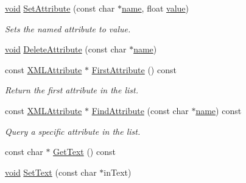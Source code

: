 \begin{DoxyCompactItemize}
\mbox{\label{classtinyxml2_1_1_x_m_l_element_a554b70d882e65b28fc084b23df9b9759}} 
\hyperlink{interfacevoid}{void} \hyperlink{classtinyxml2_1_1_x_m_l_element_a554b70d882e65b28fc084b23df9b9759}{Set\+Attribute} (const char $\ast$\hyperlink{structname}{name}, float \hyperlink{unionvalue}{value})
\begin{DoxyCompactList}\small\item\em Sets the named attribute to value. \end{DoxyCompactList}\item 
\hyperlink{interfacevoid}{void} \hyperlink{classtinyxml2_1_1_x_m_l_element_aebd45aa7118964c30b32fe12e944628a}{Delete\+Attribute} (const char $\ast$\hyperlink{structname}{name})
\item 
\mbox{\label{classtinyxml2_1_1_x_m_l_element_a3e191704c8d499906ec11fe2f60c6686}} 
const \hyperlink{classtinyxml2_1_1_x_m_l_attribute}{X\+M\+L\+Attribute} $\ast$ \hyperlink{classtinyxml2_1_1_x_m_l_element_a3e191704c8d499906ec11fe2f60c6686}{First\+Attribute} () const
\begin{DoxyCompactList}\small\item\em Return the first attribute in the list. \end{DoxyCompactList}\item 
\mbox{\label{classtinyxml2_1_1_x_m_l_element_a157750dac8037a316fd1af1a973dfa2c}} 
const \hyperlink{classtinyxml2_1_1_x_m_l_attribute}{X\+M\+L\+Attribute} $\ast$ \hyperlink{classtinyxml2_1_1_x_m_l_element_a157750dac8037a316fd1af1a973dfa2c}{Find\+Attribute} (const char $\ast$\hyperlink{structname}{name}) const
\begin{DoxyCompactList}\small\item\em Query a specific attribute in the list. \end{DoxyCompactList}\item 
const char $\ast$ \hyperlink{classtinyxml2_1_1_x_m_l_element_a0fa5bea0a4daf3ddd503dcabb823eba6}{Get\+Text} () const
\item 
\hyperlink{interfacevoid}{void} \hyperlink{classtinyxml2_1_1_x_m_l_element_a1f9c2cd61b72af5ae708d37b7ad283ce}{Set\+Text} (const char $\ast$in\+Text)
\item 
\mbox{\label{classtinyxml2_1_1_x_m_l_element_aeae8917b5ea6060b3c08d4e3d8d632d7}} 

\end{DoxyCompactItemize}
